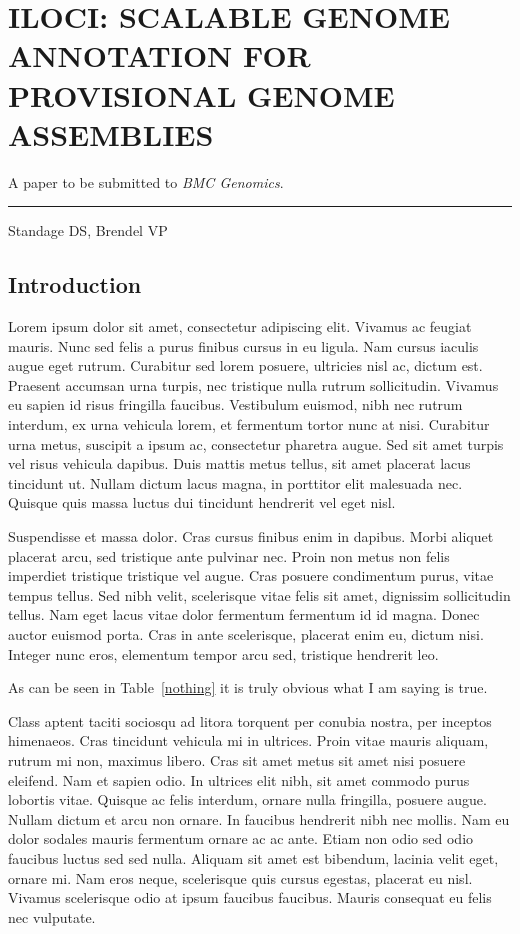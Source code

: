 \chapter{ILOCI: SCALABLE GENOME ANNOTATION FOR PROVISIONAL GENOME ASSEMBLIES}

A paper to be submitted to \textit{BMC Genomics}.

\noindent\hfil\rule{0.5\textwidth}{.4pt}\hfil

Standage DS, Brendel VP

\section{Introduction}

Lorem ipsum dolor sit amet, consectetur adipiscing elit. Vivamus ac feugiat mauris. Nunc sed felis a purus finibus cursus in eu ligula. Nam cursus iaculis augue eget rutrum. Curabitur sed lorem posuere, ultricies nisl ac, dictum est. Praesent accumsan urna turpis, nec tristique nulla rutrum sollicitudin. Vivamus eu sapien id risus fringilla faucibus. Vestibulum euismod, nibh nec rutrum interdum, ex urna vehicula lorem, et fermentum tortor nunc at nisi. Curabitur urna metus, suscipit a ipsum ac, consectetur pharetra augue. Sed sit amet turpis vel risus vehicula dapibus. Duis mattis metus tellus, sit amet placerat lacus tincidunt ut. Nullam dictum lacus magna, in porttitor elit malesuada nec. Quisque quis massa luctus dui tincidunt hendrerit vel eget nisl.

Suspendisse et massa dolor. Cras cursus finibus enim in dapibus. Morbi aliquet placerat arcu, sed tristique ante pulvinar nec. Proin non metus non felis imperdiet tristique tristique vel augue. Cras posuere condimentum purus, vitae tempus tellus. Sed nibh velit, scelerisque vitae felis sit amet, dignissim sollicitudin tellus. Nam eget lacus vitae dolor fermentum fermentum id id magna. Donec auctor euismod porta. Cras in ante scelerisque, placerat enim eu, dictum nisi. Integer nunc eros, elementum tempor arcu sed, tristique hendrerit leo.

As can be seen in Table~\ref{nothing} it is truly obvious what I am saying is true.

\begin{table}[h!tb] \centering
{}
\label{nothing}
\vspace{ 2 in}
\end{table}

Class aptent taciti sociosqu ad litora torquent per conubia nostra, per inceptos himenaeos. Cras tincidunt vehicula mi in ultrices. Proin vitae mauris aliquam, rutrum mi non, maximus libero. Cras sit amet metus sit amet nisi posuere eleifend. Nam et sapien odio. In ultrices elit nibh, sit amet commodo purus lobortis vitae. Quisque ac felis interdum, ornare nulla fringilla, posuere augue. Nullam dictum et arcu non ornare. In faucibus hendrerit nibh nec mollis. Nam eu dolor sodales mauris fermentum ornare ac ac ante. Etiam non odio sed odio faucibus luctus sed sed nulla. Aliquam sit amet est bibendum, lacinia velit eget, ornare mi. Nam eros neque, scelerisque quis cursus egestas, placerat eu nisl. Vivamus scelerisque odio at ipsum faucibus faucibus. Mauris consequat eu felis nec vulputate.

